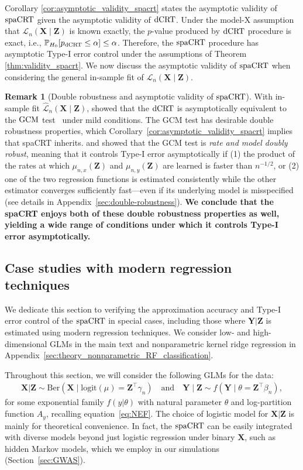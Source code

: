 \documentclass[12pt]{article}
\theoremstyle{definition}
\newtheorem{remark}{Remark}
\def\P{\mathbb{P}}
\def\P{\mathbb{P}}
\renewcommand{\P}{\mathbb{P}}							%
\newcommand{\prx}{\bm X}								%
\newcommand{\prz}{\bm Z}								%
\newcommand{\pry}{{\bm Y}}								%
\newcommand{\law}{\mathcal L}							%
\newcommand{\lawhat}{\widehat{\mathcal L}}				%
\newcommand{\dCRT}{\textnormal{dCRT}} 					%
\newcommand{\GCM}{\textnormal{GCM}}						%
\newcommand{\spacrt}{\textnormal{spaCRT}}               %
\begin{document}
  Corollary \ref{cor:asymptotic_validity_spacrt} states the asymptotic validity of $\spacrt$ given the asymptotic validity of $\dCRT$. Under the model-X assumption that $\law_n(\prx \mid \prz)$ is known exactly, the $p$-value produced by $\dCRT$ procedure is exact, i.e., $\P_{H_0}[p_{\dCRT}\leq \alpha]\leq \alpha$. Therefore, the $\spacrt$ procedure has asymptotic Type-I error control under the assumptions of Theorem \ref{thm:validity_spacrt}. We now discuss the asymptotic validity of $\spacrt$ when considering the general in-sample fit of $\law_n(\prx \mid \prz)$.
    \begin{remark}[Double robustness and asymptotic validity of $\spacrt$]\label{rmk:double-robustness}
    With in-sample fit $\lawhat_n(\prx\mid\prz)$, \citet{Niu2022a} showed that the $\dCRT$ is asymptotically equivalent to the $\GCM$ test~\citep{Shah2018} under mild conditions. The GCM test has desirable double robustness properties, which Corollary~\ref{cor:asymptotic_validity_spacrt} implies that spaCRT inherits. \citet{Shah2018} and \citet{Smucler2019} showed that the GCM test is \textit{rate and model doubly robust}, meaning that it controls Type-I error asymptotically if (1) the product of the rates at which $\mu_{n,x}(\prz)$ and $\mu_{n,y}(\prz)$ are learned is faster than $n^{-1/2}$, or (2) one of the two regression functions is estimated consistently while the other estimator converges sufficiently fast—even if its underlying model is misspecified (see details in Appendix~\ref{sec:double-robustness}). \textbf{We conclude that the spaCRT enjoys both of these double robustness properties as well, yielding a wide range of conditions under which it controls Type-I error asymptotically.} 
  \end{remark}
  
  \subsection{Case studies with modern regression techniques}\label{sec:case_study}
  
  We dedicate this section to verifying the approximation accuracy and Type-I error control of the $\spacrt$ in special cases, including those where $\pry|\prz$ is estimated using modern regression techniques. We consider low- and high-dimensional GLMs in the main text and nonparametric kernel ridge regression in Appendix~\ref{sec:theory_nonparametric_RF_classification}. 
  
  Throughout this section, we will consider the following GLMs for the data:
  \begin{align*}
	\prx|\prz\sim \mathrm{Ber}(\prx \mid \text{logit}(\mu) = \prz^\top \gamma_n)\quad\text{and}\quad \pry\mid\prz\sim f(\pry \mid \theta = \prz^\top \beta_{n}),
  \end{align*}
  for some exponential family $f(y|\theta)$ with natural parameter $\theta$ and log-partition function $A_y$, recalling equation~\eqref{eq:NEF}. The choice of logistic model for $\prx|\prz$ is mainly for theoretical convenience. In fact, the $\spacrt$ can be easily integrated with diverse models beyond just logistic regression under binary $\prx$, such as hidden Markov models, which we employ in our simulations (Section~\ref{sec:GWAS}).
\end{document}
